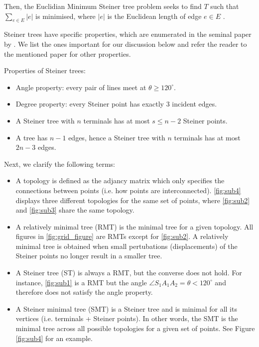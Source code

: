 \documentclass{l4proj}
\begin{document}
Then, the Euclidian Minimum Steiner tree problem seeks to find $T$ such that $\sum_{e \in E} |e|$ is minimised, where $|e|$ is the Euclidean length of edge $e \in E$ \citep{Brazil2014}.

Steiner trees have specific properties, which are enumerated in the seminal paper by \cite{Gilbert1968SteinerMT}. We list the ones important for our discussion below and refer the reader to the mentioned paper for other properties.

Properties of Steiner trees:
\begin{itemize}
      \item Angle property: every pair of lines meet at $\theta \geq 120^\circ$.
      \item Degree property: every Steiner point has exactly 3 incident edges.
      \item A Steiner tree with $n$ terminals has at most $s \leq n - 2$ Steiner points.
      \item A tree has $n - 1$ edges, hence a Steiner tree with $n$ terminals has at most $2n - 3$ edges.
\end{itemize}

Next, we clarify the following terms:
\begin{itemize}
      \item A topology is defined as the adjancy matrix which only specifies the connections between points (i.e. how points are interconnected). \ref{fig:sub4} displays three different topologies for the same set of points, where \ref{fig:sub2} and \ref{fig:sub3} share the same topology.
      \item A relatively minimal tree (RMT) is the minimal tree for a given topology. All figures in \ref{fig:grid_figure} are RMTs except for \ref{fig:sub2}. A relatively minimal tree is obtained when small pertubations (displacements) of the Steiner points no longer result in a smaller tree.
      \item  A Steiner tree (ST) is always a RMT, but the converse does not hold. For instance, \ref{fig:sub1} is a RMT but the angle $\angle S_1A_1A_2 = \theta < 120^\circ$ and therefore does not satisfy the angle property.
      \item A Steiner minimal tree (SMT) is a Steiner tree and is minimal for all its vertices (i.e. terminals + Steiner points). In other words, the SMT is the minimal tree across all possible topologies for a given set of points. See Figure \ref{fig:sub4} for an example.
\end{itemize}
\end{document}
